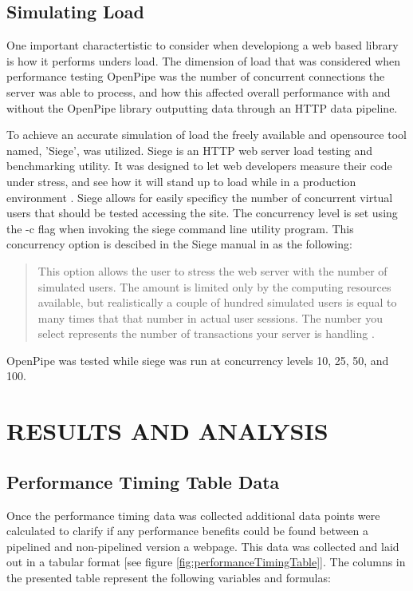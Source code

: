 \documentclass[12pt]{report}
\begin{document}
\section{Simulating Load}

One important charactertistic to consider when developiong a web based library is how it performs unders load. The dimension of load that was considered when performance testing OpenPipe was the number of concurrent connections the server was able to process, and how this affected overall performance with and without the OpenPipe library outputting data through an HTTP data pipeline.

To achieve an accurate simulation of load the freely available and opensource tool named, 'Siege', was utilized. Siege is an HTTP web server load testing and benchmarking utility. It was designed to let web developers measure their code under stress, and see how it will stand up to load while in a production environment \cite{siegeHomepage}.  Siege allows for easily specificy the number of concurrent virtual users that should be tested accessing the site. The concurrency level is set using the -c flag when invoking the siege command line utility program. This concurrency option is descibed in the Siege manual in as the following:

\begin{quote}
This option allows the user to stress the web server with the number of simulated users. The amount is limited only by the computing resources available, but realistically a couple of hundred simulated users is equal to many times that that number in actual user sessions. The number you select represents the number of transactions your server is handling \cite{siegeManual}.
\end{quote}

 OpenPipe was tested while siege was run at concurrency levels 10, 25, 50, and 100. 
 

\chapter{RESULTS AND ANALYSIS}

\section{Performance Timing Table Data}
Once the performance timing data was collected additional data points were calculated to clarify if any performance benefits could be found between a pipelined and non-pipelined version a webpage. This data was collected and laid out in a tabular format [see figure \ref{fig:performanceTimingTable}]. The columns in the presented table represent the following variables and formulas:
\end{document}

